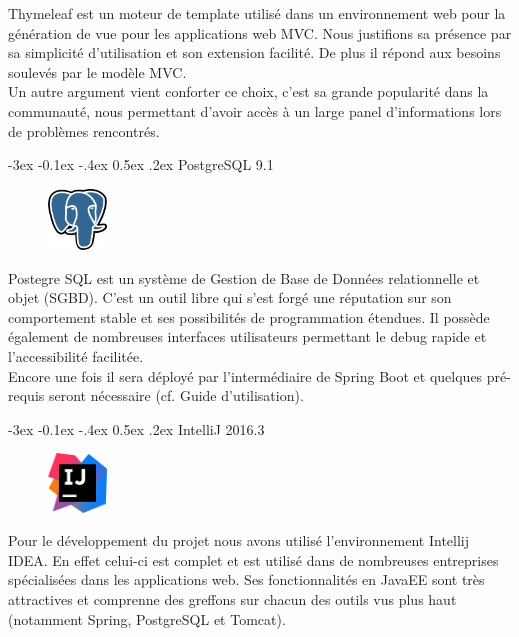 \documentclass[a4paper]{article}
\makeatletter
\renewcommand{\subsection}{\@startsection {subsection}{2}{\z@}
{-3ex \@plus -0.1ex \@minus -.4ex}
{0.5ex \@plus.2ex }
{\normalfont\sffamily\bfseries}}
\makeatother
\begin{document}
Thymeleaf est un moteur de template utilisé dans un environnement web pour la génération de vue pour les applications web MVC. Nous justifions sa présence par sa simplicité d'utilisation et son extension facilité. De plus il répond aux besoins soulevés par le modèle MVC.\\
Un autre argument vient conforter ce choix, c'est sa grande popularité dans la communauté, nous permettant d'avoir accès à un large panel d'informations lors de problèmes rencontrés.

\subsection{PostgreSQL 9.1}
\begin{figure}
\centering
\includegraphics[width=0.14\textwidth]{postgresql.png}
\end{figure}
Postegre SQL est un système de Gestion de Base de Données relationnelle et objet (SGBD). C'est un outil libre qui s'est forgé une réputation sur son comportement stable et ses possibilités de programmation étendues. Il possède également de nombreuses interfaces utilisateurs permettant le debug rapide et l'accessibilité facilitée.\\
Encore une fois il sera déployé par l'intermédiaire de Spring Boot et quelques pré-requis seront nécessaire (cf. Guide d'utilisation).

\subsection{IntelliJ 2016.3}
\begin{figure}
\centering
\includegraphics[width=0.14\textwidth]{intellij.png}
\end{figure}
Pour le développement du projet nous avons utilisé l'environnement Intellij IDEA. En effet celui-ci est complet et est utilisé dans de nombreuses entreprises spécialisées dans les applications web. Ses fonctionnalités en JavaEE sont très attractives et comprenne des greffons sur chacun des outils vus plus haut (notamment Spring, PostgreSQL et Tomcat).
\end{document}
